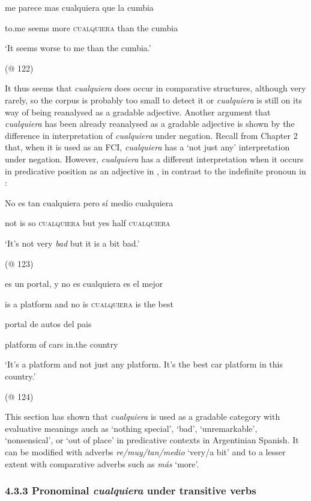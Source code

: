 \documentclass[output=paper]{langscibook}
\begin{document}
    me  parece  mas  cualquiera  que  la  cumbia

    to.me  seems  more  \textsc{cualquiera}  than  the  cumbia

    ‘It seems worse to me than the cumbia.’

    (@ 122)

It thus seems that \textit{cualquiera} does occur in comparative structures, although very rarely, so the corpus is probably too small to detect it or \textit{cualquiera} is still on its way of being reanalysed as a gradable adjective. Another argument that \textit{cualquiera} has been already reanalysed as a gradable adjective is shown by the difference in interpretation of \textit{cualquiera} under negation. Recall from Chapter 2 that, when it is used as an FCI, \textit{cualquiera} has a ‘not just any’ interpretation under negation. However, \textit{cualquiera} has a different interpretation when it occurs in predicative position as an adjective in , in contrast to the indefinite pronoun in : 

\label{bkm:Ref63460902}    No  es  tan  cualquiera  pero  sí  medio  cualquiera

    not  is  so  \textsc{cualquiera}  but  yes  half  \textsc{cualquiera}

    ‘It’s not very \textit{bad} but it is a bit bad.’

    (@ 123)

\label{bkm:Ref63460922}    es  un  portal,  y  no  es  cualquiera  es  el  mejor  

    is  a  platform  and  no  is  \textsc{cualquiera}  is  the  best

    portal  de  autos  del  pais

    platform  of   cars  in.the  country

    ‘It’s a platform and not just any platform. It’s the best car platform in this country.’

    (@ 124)

This section has shown that \textit{cualquiera} is used as a gradable category with evaluative meanings auch as ‘nothing special’, ‘bad’, ‘unremarkable’, ‘nonsensical’, or ‘out of place’ in predicative contexts in Argentinian Spanish. It can be modified with adverbs \textit{re/muy/tan/medio} ‘very/a bit’ and to a lesser extent with comparative adverbs such as \textit{más} ‘more’.

\subsubsection{\textbf{4.3.3} \textbf{Pronominal} \textbf{\textit{cualquiera}}\textbf{ }\textbf{under} \textbf{transitive} \textbf{verbs}}
\end{document}
